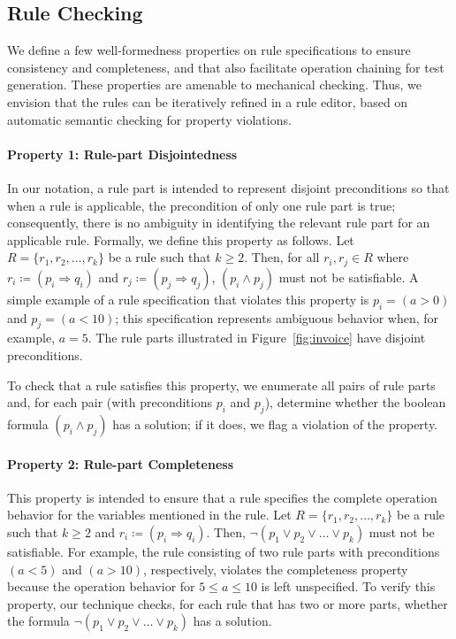 \subsection{Rule Checking}
\label{sec:checking}
 
We define a few well-formedness properties on rule specifications to ensure
consistency and completeness, and that also facilitate operation chaining for
test generation. These properties are amenable to mechanical checking. Thus, we
envision that the rules can be iteratively refined in a rule editor, based on
automatic semantic checking for property violations. %

\paragraph*{Property 1: Rule-part Disjointedness}
In our notation, a rule part is intended to represent disjoint preconditions so
that when a rule is applicable, the precondition of only one rule part is true;
consequently, there is no ambiguity in identifying the relevant rule part for an
applicable rule. Formally, we define this property as follows. Let $R= \{r_1,
r_2, \ldots, r_k\}$ be a rule such that $k \geq 2$. Then, for all $r_i, r_j \in
R$ where $ r_i \coloneqq (p_i \Longrightarrow q_i)$ and $r_j \coloneqq (p_j
\Longrightarrow q_j)$, $(p_i \wedge p_j)$ must not be satisfiable. A simple
example of a rule specification that violates this property is $p_i = (a > 0)$
and $p_j = (a < 10)$; this specification represents ambiguous behavior when, for
example, $a = 5$.  The rule parts illustrated in Figure~\ref{fig:invoice} have
disjoint preconditions.

To check that a rule satisfies this property, we enumerate all pairs of rule
parts and, for each pair (with preconditions $p_i$ and $p_j$), determine whether
the boolean formula $(p_i \wedge p_j)$ has a solution; if it does, we flag a
violation of the property.

\paragraph*{Property 2: Rule-part Completeness}
This property is intended to ensure that a rule specifies the complete operation
behavior for the variables mentioned in the rule. Let $R= \{r_1, r_2, \ldots,
r_k\}$ be a rule such that $k \geq 2$ and $r_i \coloneqq (p_i \Longrightarrow
q_i)$. Then, $\neg(p_1 \vee p_2 \vee \ldots \vee p_k)$ must not be
satisfiable. For example, the rule consisting of two rule parts with
preconditions $(a < 5)$ and $(a > 10)$, respectively, violates the completeness
property because the operation behavior for $5 \leq a \leq 10$ is left
unspecified.  To verify this property, our technique checks, for each rule that
has two or more parts, whether the formula $\neg(p_1 \vee p_2 \vee \ldots \vee
p_k)$ has a solution.

